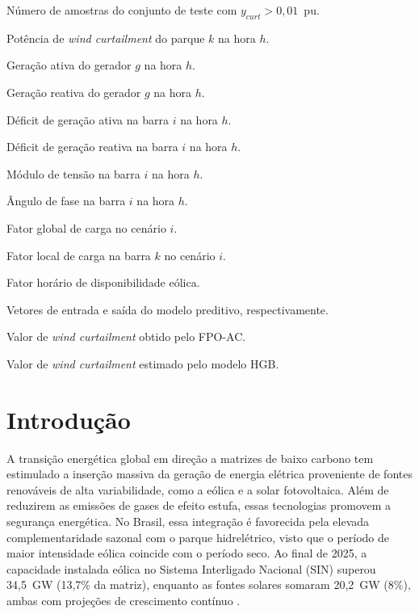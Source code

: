 \documentclass[conference]{IEEEtran}
\begin{document}
\begin{list}{}
\item[$N_{+}$]                Número de amostras do conjunto de teste com $y_{curt} > 0{,}01$~pu.
\item[$P_{CW,k}^{h}$]   Potência de \textit{wind curtailment} do parque $k$ na hora $h$.
\item[$P_{g}^{h}$]       Geração ativa do gerador $g$ na hora $h$.
\item[$Q_{g}^{h}$]       Geração reativa do gerador $g$ na hora $h$.
\item[$P_{D,i}^{h}$]    Déficit de geração ativa na barra $i$ na hora $h$.
\item[$Q_{D,i}^{h}$]    Déficit de geração reativa na barra $i$ na hora $h$.
\item[$V_{i}^{h}$]       Módulo de tensão na barra $i$ na hora $h$.
\item[$\theta_{i}^{h}$]  Ângulo de fase na barra $i$ na hora $h$.
\item[$f_g^{(i)}$]       Fator global de carga no cenário $i$.
\item[$f_{\ell,i,k}$]    Fator local de carga na barra $k$ no cenário $i$.
\item[$f_{\text{wind},h}$] Fator horário de disponibilidade eólica.
\item[$X^h, Y^h$]        Vetores de entrada e saída do modelo preditivo, respectivamente.
\item[$y_{curt}$]        Valor de \textit{wind curtailment} obtido pelo FPO-AC.
\item[$\hat{y}_{curt}$]  Valor de \textit{wind curtailment} estimado pelo modelo HGB.
\end{list}

\section{Introdução}

A transição energética global em direção a matrizes de baixo carbono tem estimulado a inserção massiva da geração de energia elétrica proveniente de fontes renováveis de alta variabilidade, como a eólica e a solar fotovoltaica. Além de reduzirem as emissões de gases de efeito estufa, essas tecnologias promovem a segurança energética. No Brasil, essa integração é favorecida pela elevada complementaridade sazonal com o parque hidrelétrico, visto que o período de maior intensidade eólica coincide com o período seco. Ao final de 2025, a capacidade instalada eólica no Sistema Interligado Nacional (SIN) superou 34,5~GW (13,7\% da matriz), enquanto as fontes solares somaram 20,2~GW (8\%), ambas com projeções de crescimento contínuo \cite{ONS_em_numeros}.
\end{document}
